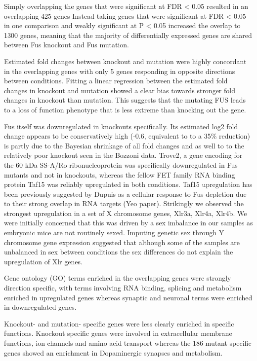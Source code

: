 Simply overlapping the genes that were significant at FDR < 0.05 resulted in an overlapping 425 genes
Instead taking genes that were significant at FDR < 0.05 in one comparison and weakly significant at P < 0.05 increased the overlap to 1300 genes,  meaning that the majority of differentially expressed genes are shared between Fus knockout and Fus mutation.

Estimated fold changes between knockout and mutation were highly concordant in the overlapping genes with only 5 genes responding in opposite directions between conditions. Fitting a linear regression between the estimated fold changes in knockout and mutation showed a clear bias towards stronger fold changes in knockout than mutation. 
This suggests that the mutating FUS leads to a loss of function phenotype that is less extreme than knocking out the gene.

Fus itself was downregulated in knockouts specifically. Its estimated log2 fold change appears to be conservatively high (-0.6, equivalent to to a 35\% reduction) is partly due to the Bayesian shrinkage of all fold changes and as well to to the relatively poor knockout seen in the Bozzoni data. Trove2, a gene encoding for the 60 kDa SS-A/Ro ribonucleoprotein was specifically downregulated in Fus mutants and not in knockouts, whereas the fellow FET family RNA binding protein Taf15 was reliably upregulated in both conditions. Taf15 upregulation has been previously suggested by Dupuis as a cellular response to Fus depletion due to their strong overlap in RNA targets (Yeo paper). Strikingly we observed the strongest upregulation in a set of X chromosome genes, Xlr3a, Xlr4a, Xlr4b. We were initially concerned that this was driven by a sex imbalance in our samples as embryonic mice are not routinely sexed. Imputing genetic sex through Y chromosome gene expression suggested that although some of the samples are unbalanced in sex between conditions the sex differences do not explain the upregulation of Xlr genes.

Gene ontology (GO) terms enriched in the overlapping genes were strongly direction specific, with terms involving RNA binding, splicing and metabolism enriched in upregulated genes whereas synaptic and neuronal terms were enriched in downregulated genes.

Knockout- and mutation- specific genes were less clearly enriched in specific functions. Knockout specific genes were involved in extracellular membrane functions, ion channels and amino acid transport whereas the 186 mutant specific genes showed an enrichment in Dopaminergic synapses and metabolism.

